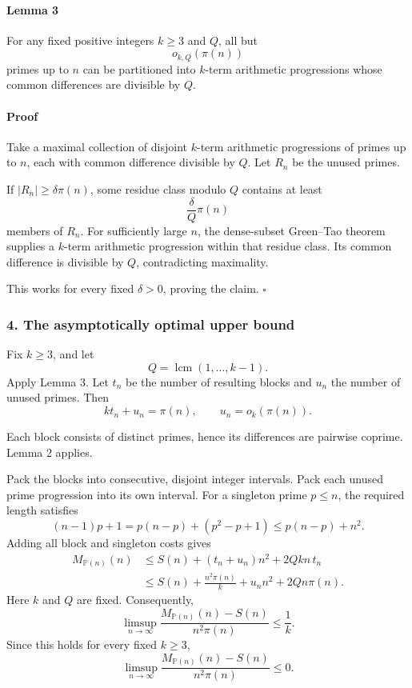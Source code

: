 \documentclass[
  11pt,
  a4paper,
]{article}
\begin{document}
\paragraph{Lemma 3}\label{lemma-3}

For any fixed positive integers \(k\ge3\) and \(Q\), all but \[
o_{k,Q}(\pi(n))
\] primes up to \(n\) can be partitioned into \(k\)-term arithmetic
progressions whose common differences are divisible by \(Q\).

\paragraph{Proof}\label{proof-2}

Take a maximal collection of disjoint \(k\)-term arithmetic progressions
of primes up to \(n\), each with common difference divisible by \(Q\).
Let \(R_n\) be the unused primes.

If \(|R_n|\ge\delta\pi(n)\), some residue class modulo \(Q\) contains at
least \[
\frac{\delta}{Q}\pi(n)
\] members of \(R_n\). For sufficiently large \(n\), the dense-subset
Green--Tao theorem supplies a \(k\)-term arithmetic progression within
that residue class. Its common difference is divisible by \(Q\),
contradicting maximality.

This works for every fixed \(\delta>0\), proving the claim. \(\square\)

\subsubsection{4. The asymptotically optimal upper
bound}\label{the-asymptotically-optimal-upper-bound}

Fix \(k\ge3\), and let \[
Q=\operatorname{lcm}(1,\ldots,k-1).
\] Apply Lemma 3. Let \(t_n\) be the number of resulting blocks and
\(u_n\) the number of unused primes. Then \[
kt_n+u_n=\pi(n),
\qquad
u_n=o_k(\pi(n)).
\]

Each block consists of distinct primes, hence its differences are
pairwise coprime. Lemma 2 applies.

Pack the blocks into consecutive, disjoint integer intervals. Pack each
unused prime progression into its own interval. For a singleton prime
\(p\le n\), the required length satisfies \[
(n-1)p+1
=
p(n-p)+(p^2-p+1)
\le p(n-p)+n^2.
\] Adding all block and singleton costs gives \begin{equation*}
\begin{aligned}
M_{\mathbb P(n)}(n)
&\le S(n)+(t_n+u_n)n^2+2Qkn\,t_n\\
&\le S(n)+\frac{n^2\pi(n)}k
       +u_n n^2+2Qn\pi(n).
\end{aligned}
\end{equation*} Here \(k\) and \(Q\) are fixed. Consequently, \[
\limsup_{n\to\infty}
\frac{M_{\mathbb P(n)}(n)-S(n)}{n^2\pi(n)}
\le \frac1k.
\] Since this holds for every fixed \(k\ge3\), \[
\boxed{\;
\limsup_{n\to\infty}
\frac{M_{\mathbb P(n)}(n)-S(n)}{n^2\pi(n)}
\le0.
\;}
\]
\end{document}
